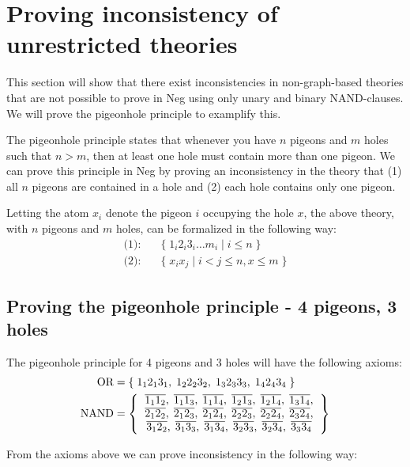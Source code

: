 \section{Proving inconsistency of unrestricted theories}
\label{sec:Proving inconsistency of unrestricted theories}
This section will show that there exist inconsistencies in non-graph-based theories that are not possible to prove in Neg using only unary and binary NAND-clauses.
We will prove the pigeonhole principle to examplify this.

The pigeonhole principle states that whenever you have $n$ pigeons and $m$ holes such that $n > m$, then at least one hole must contain more than one pigeon.
We can prove this principle in Neg by proving an inconsistency in the theory that (1) all $n$ pigeons are contained in a hole and (2) each hole contains only one pigeon.

Letting the atom $x_i$ denote the pigeon $i$ occupying the hole $x$, the above theory, with $n$ pigeons and $m$ holes, can be formalized in the following way:
\begin{align}
  \text{(1):}\quad &\{ \; 1_i2_i3_i\dots m_i \;|\; i \leq n \; \}\\
  \text{(2):}\quad &\{ \; x_ix_j \;|\; i < j \leq n, x \leq m \; \}
\end{align}
\subsection{Proving the pigeonhole principle - 4 pigeons, 3 holes}
\label{sub:Proving the pigeonhole principle - 4 pigeons, 3 holes}
The pigeonhole principle for 4 pigeons and 3 holes will have the following axioms:
\begin{align}
  \text{OR} &= \{ \; 1_12_13_1,\; 1_22_23_2,\; 1_32_33_3,\; 1_42_43_4 \; \}\\
  \text{NAND} &= \left \{
  \begin{tabular}{c}
    $\ol{1_11_2},\;\ol{1_11_3},\;\ol{1_11_4},\;\ol{1_21_3},\;\ol{1_21_4},\;\ol{1_31_4},$\\
    $\ol{2_12_2},\;\ol{2_12_3},\;\ol{2_12_4},\;\ol{2_22_3},\;\ol{2_22_4},\;\ol{2_32_4},$\\
    $\ol{3_12_2},\;\ol{3_13_3},\;\ol{3_13_4},\;\ol{3_23_3},\;\ol{3_23_4},\;\ol{3_33_4}$
  \end{tabular}
  \right \}
\end{align}

From the axioms above we can prove inconsistency in the following way:

